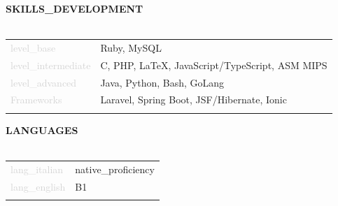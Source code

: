 \documentclass{article}
\begin{document}
\textbf{\textcolor{deepblue}{\uppercase{{{skills_development}}}}} \\\\ \hfill
\begin{tabular}{ R{4cm} L{11cm} }
	\textcolor{lightgray}{{{level_base}}} & Ruby, MySQL \\ \hfill
	\textcolor{lightgray}{{{level_intermediate}}} & C, PHP, LaTeX, JavaScript/TypeScript, ASM MIPS \\ \hfill
	\textcolor{lightgray}{{{level_advanced}}} & Java, Python, Bash, GoLang \\[.5cm] \hfill
	\textcolor{lightgray}{Frameworks} & Laravel, Spring Boot, JSF/Hibernate, Ionic     \\ \hfill
\end{tabular}

\textbf{\textcolor{deepblue}{\uppercase{{{languages}}}}} \\\\ \hfill
\begin{tabular}{ R{4cm} L{11cm} }
	\textcolor{lightgray}{{{lang_italian}}} & {{native_proficiency}} \\ \hfill
	\textcolor{lightgray}{{{lang_english}}} & B1 \\ \hfill
\end{tabular}
\end{document}
